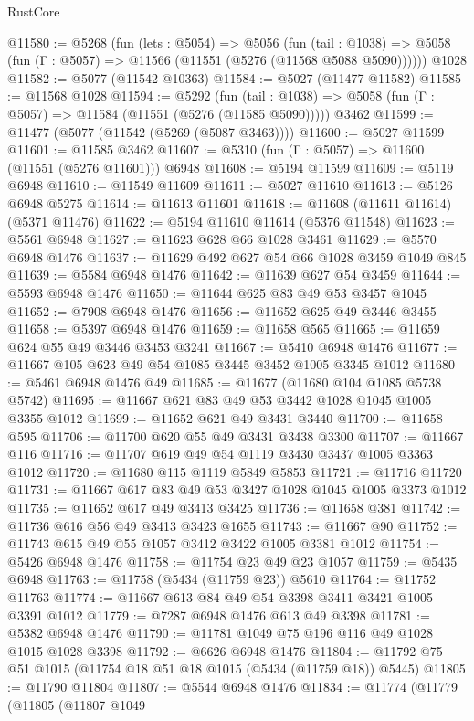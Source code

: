 \begin{lexlean}{RustCore}
\begin{coremodule}
@11580 := @5268
    (fun (lets : @5054) =>
    @5056
      (fun (tail : @1038) =>
      @5058 (fun (Γ : @5057) => @11566 (@11551 (@5276 (@11568 @5088 @5090))))))
    @1028
@11582 := @5077 (@11542 @10363)
@11584 := @5027 (@11477 @11582)
@11585 := @11568 @1028
@11594 := @5292
    (fun (tail : @1038) => @5058 (fun (Γ : @5057) => @11584 (@11551 (@5276 (@11585 @5090)))))
    @3462
@11599 := @11477 (@5077 (@11542 (@5269 (@5087 @3463))))
@11600 := @5027 @11599
@11601 := @11585 @3462
@11607 := @5310 (fun (Γ : @5057) => @11600 (@11551 (@5276 @11601))) @6948
@11608 := @5194 @11599
@11609 := @5119 @6948
@11610 := @11549 @11609
@11611 := @5027 @11610
@11613 := @5126 @6948 @5275
@11614 := @11613 @11601
@11618 := @11608 (@11611 @11614) (@5371 @11476)
@11622 := @5194 @11610 @11614 (@5376 @11548)
@11623 := @5561 @6948
@11627 := @11623 @628 @66 @1028 @3461
@11629 := @5570 @6948 @1476
@11637 := @11629 @492 @627 @54 @66 @1028 @3459 @1049 @845
@11639 := @5584 @6948 @1476
@11642 := @11639 @627 @54 @3459
@11644 := @5593 @6948 @1476
@11650 := @11644 @625 @83 @49 @53 @3457 @1045
@11652 := @7908 @6948 @1476
@11656 := @11652 @625 @49 @3446 @3455
@11658 := @5397 @6948 @1476
@11659 := @11658 @565
@11665 := @11659 @624 @55 @49 @3446 @3453 @3241
@11667 := @5410 @6948 @1476
@11677 := @11667 @105 @623 @49 @54 @1085 @3445 @3452 @1005 @3345 @1012
@11680 := @5461 @6948 @1476 @49
@11685 := @11677 (@11680 @104 @1085 @5738 @5742)
@11695 := @11667 @621 @83 @49 @53 @3442 @1028 @1045 @1005 @3355 @1012
@11699 := @11652 @621 @49 @3431 @3440
@11700 := @11658 @595
@11706 := @11700 @620 @55 @49 @3431 @3438 @3300
@11707 := @11667 @116
@11716 := @11707 @619 @49 @54 @1119 @3430 @3437 @1005 @3363 @1012
@11720 := @11680 @115 @1119 @5849 @5853
@11721 := @11716 @11720
@11731 := @11667 @617 @83 @49 @53 @3427 @1028 @1045 @1005 @3373 @1012
@11735 := @11652 @617 @49 @3413 @3425
@11736 := @11658 @381
@11742 := @11736 @616 @56 @49 @3413 @3423 @1655
@11743 := @11667 @90
@11752 := @11743 @615 @49 @55 @1057 @3412 @3422 @1005 @3381 @1012
@11754 := @5426 @6948 @1476
@11758 := @11754 @23 @49 @23 @1057
@11759 := @5435 @6948
@11763 := @11758 (@5434 (@11759 @23)) @5610
@11764 := @11752 @11763
@11774 := @11667 @613 @84 @49 @54 @3398 @3411 @3421 @1005 @3391 @1012
@11779 := @7287 @6948 @1476 @613 @49 @3398
@11781 := @5382 @6948 @1476
@11790 := @11781 @1049 @75 @196 @116 @49 @1028 @1015 @1028 @3398
@11792 := @6626 @6948 @1476
@11804 := @11792 @75 @51 @1015 (@11754 @18 @51 @18 @1015 (@5434 (@11759 @18)) @5445)
@11805 := @11790 @11804
@11807 := @5544 @6948 @1476
@11834 := @11774
    (@11779
      (@11805
        (@11807
          @1049

\end{coremodule}
\end{lexlean}

